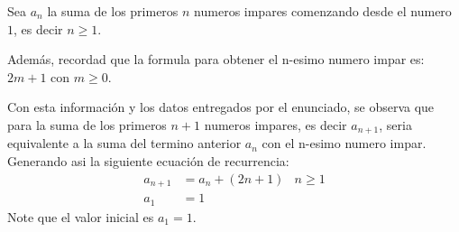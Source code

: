 \begin{solution}
  Sea $a_n$ la suma de los primeros $n$ numeros impares comenzando desde el numero $1$, es decir $n \ge 1$. 
  
  Además, recordad que la formula para obtener el n-esimo numero impar es: $2m + 1$ con $m \ge 0$.
  
  Con esta información y los datos entregados por el enunciado, se observa que para la suma de los primeros $n+1$ numeros impares, es decir $a_{n+1}$, seria equivalente a la suma del termino anterior $a_n$ con el n-esimo numero impar. Generando asi la siguiente ecuación de recurrencia:
  \begin{align*}
    a_{n+1} &= a_n + (2n +1) & n \ge 1 \tag{$\star$} \\
    a_1 &= 1 \nonumber
  \end{align*}
  Note que el valor inicial es $a_1 = 1$.
  

\end{solution}
